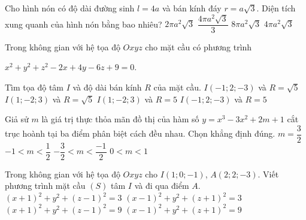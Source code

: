 \begin{ex}%
		Cho hình nón có độ dài đường sinh $l=4a$ và bán kính đáy $r=a\sqrt{3}$. Diện tích xung quanh của hình nón bằng bao nhiêu?
		\choice
		{$2\pi a^2\sqrt{3}$}
		{$\dfrac{4\pi a^2\sqrt{3}}{3}$}
		{$8\pi a^2\sqrt{3}$}
		{\True $4\pi a^2\sqrt{3}$}
	\end{ex}
\begin{ex}%
		Trong không gian với hệ tọa độ $Oxyz$ cho mặt cầu có phương trình
		\begin{center}
		$x^2+y^2+z^2-2x+4y-6z+9=0$.
		\end{center}
		Tìm tọa độ tâm $I$ và độ dài bán kính $R$ của mặt cầu.
		\choice
		{$I\left(-1;2;-3\right)$ và $R=\sqrt{5}$}
		{\True $I\left(1;-2;3\right)$ và $R=\sqrt{5}$}
		{$I\left(1;-2;3\right)$ và $R=5$}
		{$I\left(-1;2;-3\right)$ và $R=5$}
	\end{ex}
\begin{ex}%
		Giả sử $m$ là giá trị thực thỏa mãn đồ thị của hàm số $y=x^3-3x^2+2m+1$ cắt trục hoành tại ba điểm phân biệt cách đều nhau. Chọn khẳng định đúng.
		\choice
		{$m=\dfrac{3}{2}$}
		{$-1<m<\dfrac{1}{2}$}
		{$-\dfrac{3}{2}<m<\dfrac{-1}{2}$}
		{\True $0<m<1$}
	\end{ex}
\begin{ex}%
		Trong không gian với hệ tọa độ $Oxyz$ cho $I\left(1;0;-1\right)$, $ A\left(2;2;-3\right)$. Viết phương trình mặt cầu $(S)$ tâm $I$ và đi qua điểm $A$.
		\choice
		{${\left(x+1\right)}^2+y^2+{\left(z-1\right)}^2=3$}
		{${\left(x-1\right)}^2+y^2+{\left(z+1\right)}^2=3$}
		{${\left(x+1\right)}^2+y^2+{\left(z-1\right)}^2=9$}
		{\True ${\left(x-1\right)}^2+y^2+{\left(z+1\right)}^2=9$}
	\end{ex}
